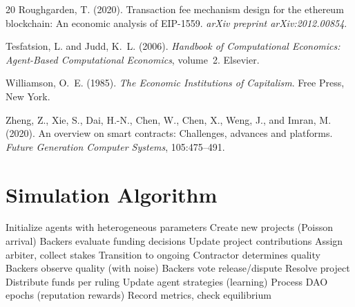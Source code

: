 \documentclass[11pt,a4paper]{article}
\begin{document}
\begin{thebibliography}{20}
Roughgarden, T. (2020).
\newblock Transaction fee mechanism design for the ethereum blockchain: An economic analysis of EIP-1559.
\newblock \emph{arXiv preprint arXiv:2012.00854}.

Tesfatsion, L. and Judd, K.~L. (2006).
\newblock \emph{Handbook of Computational Economics: Agent-Based Computational Economics}, volume~2.
\newblock Elsevier.

Williamson, O.~E. (1985).
\newblock \emph{The Economic Institutions of Capitalism}.
\newblock Free Press, New York.

Zheng, Z., Xie, S., Dai, H.-N., Chen, W., Chen, X., Weng, J., and Imran, M. (2020).
\newblock An overview on smart contracts: Challenges, advances and platforms.
\newblock \emph{Future Generation Computer Systems}, 105:475--491.

\end{thebibliography}

\appendix

\section{Simulation Algorithm}
\label{app:algorithm}

\begin{algorithm}[H]
\caption{Adaptive Economy Simulation}
\begin{algorithmic}[1]
\STATE Initialize agents with heterogeneous parameters
    \STATE Create new projects (Poisson arrival)
        \STATE Backers evaluate funding decisions
        \STATE Update project contributions
    \ENDFOR
        \STATE Assign arbiter, collect stakes
        \STATE Transition to ongoing
    \ENDFOR
        \STATE Contractor determines quality
        \STATE Backers observe quality (with noise)
        \STATE Backers vote release/dispute
            \STATE Resolve project
            \STATE Distribute funds per ruling
            \STATE Update agent strategies (learning)
        \ENDIF
    \ENDFOR
    \STATE Process DAO epochs (reputation rewards)
    \STATE Record metrics, check equilibrium
\ENDFOR
\end{algorithmic}
\end{algorithm}
\end{document}
